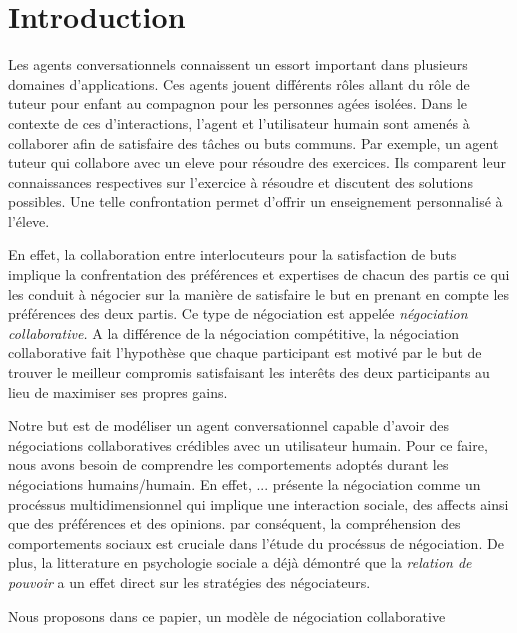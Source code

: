 \section{Introduction}
Les agents conversationnels connaissent un essort important  dans plusieurs domaines d'applications. Ces agents jouent différents rôles allant du rôle de tuteur pour enfant au compagnon pour les personnes agées isolées.
Dans le contexte de ces d'interactions,  l'agent et l'utilisateur humain  sont amenés à collaborer afin de satisfaire des tâches ou buts communs. Par exemple, un agent tuteur qui collabore avec un eleve pour résoudre des exercices. Ils comparent leur connaissances respectives sur l'exercice à résoudre et discutent des solutions possibles. Une telle confrontation  permet d'offrir un enseignement personnalisé à l'éleve. 

En effet, la collaboration entre interlocuteurs pour la satisfaction de buts implique la confrentation des préférences et expertises de chacun des partis ce qui les conduit à négocier sur la manière de satisfaire le but en prenant en compte les préférences des deux partis. Ce type de négociation est appelée \emph{négociation collaborative.} A la différence de la négociation compétitive, la négociation collaborative fait l'hypothèse que chaque participant est motivé par le but de trouver le meilleur compromis satisfaisant les interêts des deux participants au lieu de maximiser ses propres gains.

Notre but est de modéliser un agent conversationnel capable d'avoir des négociations collaboratives crédibles avec un utilisateur humain.
Pour ce faire, nous avons besoin de comprendre les comportements adoptés durant les négociations humains/humain. En effet, ... présente la négociation comme un procéssus multidimensionnel qui implique  une interaction sociale, des affects ainsi que des préférences et des opinions. par conséquent, la compréhension des comportements sociaux est cruciale dans l'étude du procéssus de négociation. De plus, la litterature en psychologie sociale  a déjà démontré que la \emph{relation de pouvoir} a un effet direct sur les stratégies des négociateurs. 


Nous proposons dans ce papier, un modèle de négociation collaborative 



